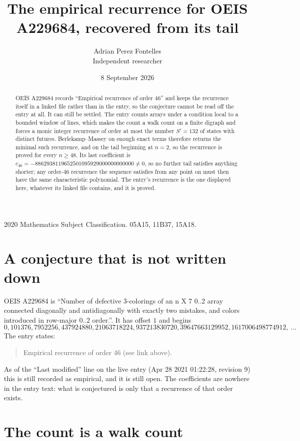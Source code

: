 \documentclass[11pt,a4paper]{article}
\title{The empirical recurrence for OEIS A229684, recovered from its tail}
\author{Adrian Perez Fontelles\\ \small Independent researcher}
\date{8 September 2026}
\theoremstyle{plain}
\theoremstyle{definition}
\begin{document}
\maketitle

\begin{abstract}
OEIS A229684 records ``Empirical recurrence of order $46$'' and keeps the recurrence itself in
a linked file rather than in the entry, so the conjecture cannot be read off the entry at all.
It can still be settled. The entry counts arrays under a condition local to a bounded window of
lines, which makes the count a walk count on a finite digraph and forces a monic integer
recurrence of order at most the number $S'=132$ of states with distinct futures. Berlekamp--Massey on
enough exact terms therefore returns the minimal such recurrence, and on the tail beginning at $n=2$, so the recurrence is proved for every $n\ge48$.
Its last coefficient is $c_{46}=-8862938119652501095929000000000000\neq0$, so no further tail satisfies anything
shorter; any order-$46$ recurrence the sequence satisfies from any point on must then have
the same characteristic polynomial. The entry's recurrence is the one displayed here, whatever
its linked file contains, and it is proved.
\end{abstract}

\noindent\small 2020 Mathematics Subject Classification. 05A15, 11B37, 15A18.\normalsize

\section{A conjecture that is not written down}

OEIS A229684 is ``Number of defective 3-colorings of an n X 7 0..2 array connected diagonally and antidiagonally with exactly two mistakes, and colors introduced in row-major 0..2 order.''. It has offset $1$ and begins
\[
0, 101376, 7952256, 437924880, 21063718224, 937213830720, 39647663129952, 1617006498774912,\ \dots
\]
The entry states:
\begin{quote}
Empirical recurrence of order 46 (see link above).
\end{quote}
As of the ``Last modified'' line on the live entry (Apr 28 2021 01:22:28, revision 9)
this is still recorded as empirical, and it is still open. The coefficients are nowhere in the
entry text: what is conjectured is only that a recurrence of that order exists.

\section{The count is a walk count}
\end{document}
